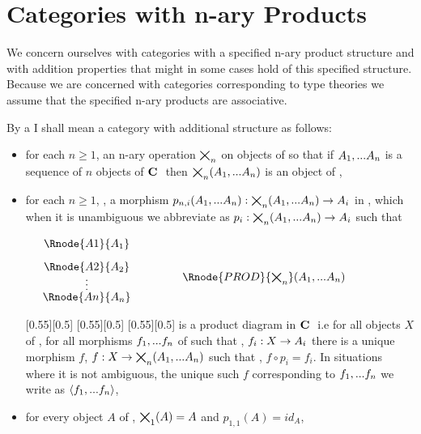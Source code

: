 \documentclass[10pt,a4paper]{scrartcl}
\begin{document}
\section{Categories with n-ary Products} 
We concern ourselves with categories with a specified n-ary product structure and 
 with addition properties that might in some cases hold of this specified structure.  
Because we are concerned with categories corresponding to type theories we assume that the specified n-ary products are associative.
\begin{definition}
By a  I shall mean a category \catcw with additional structure as follows:
\begin{itemize}
\item for each $n \geq 1$, an n-ary operation $\bigtimes_{n}$ on objects of \catcw so that if $A_1,...A_n$ is a sequence of $n$ objects of $\textbf{C}\ $ then $\bigtimes_{n}(A_1,...A_n)$ is an object of \catc,
\item for each $n \geq 1$, \foreachi, a morphism $p_{n,i}(A_1,...A_n):\bigtimes_{n}(A_1,...A_n) \rightarrow A_i$ in \catc, which when it is unambiguous we abbreviate as $p_i: \bigtimes_{n}(A_1,...A_n) \rightarrow A_i$
 such that

\begin{center}
\begin{displaymath}
\begin{array}{cp{.9cm}cp{.9cm}c}
\Rnode{A1}{A_1} & &   & &              \\ [0.3cm]
\Rnode{A2}{A_2} & &   & &              \\ [-0.1cm]
 \raisebox{-0.3cm}{\vdots} & & \Rnode{PROD}{\productn}(\An)  & &  \\ [0.2cm]
\Rnode{An}{A_n} & &   & & 
\end{array}
\end{displaymath}
\end{center}
[0.55][0.5]
{
\setlength{\arroffsetA}{2pt}
\setlength{\arroffsetA}{0pt}
}
[0.55][0.5]
{
\setlength{\arroffsetA}{2pt}
\setlength{\arroffsetA}{0pt}
}
[0.55][0.5]
is a product diagram in $\textbf{C}\ $ i.e for all objects $X$ of \catcw, for all morphisms $f_1,...f_n$ of \catcw such that \foreachi, $f_i:X \rightarrow A_i$ there is a unique
morphism $f$, $f: X \rightarrow \bigtimes_{n}(A_1,...A_n)$ such that \foreachi, $f \circ p_i = f_i$. In situations where it is not ambiguous, the unique such $f$ corresponding to $f_1,...f_n$ we write as
$\langle f_1,...f_n\rangle$,
\item
for every object $A$ of \catc, $\bigtimes_{1}(A)=A$ and $p_{1,1}(A) = id_A$,


\end{itemize}
\end{definition}
\end{document}
